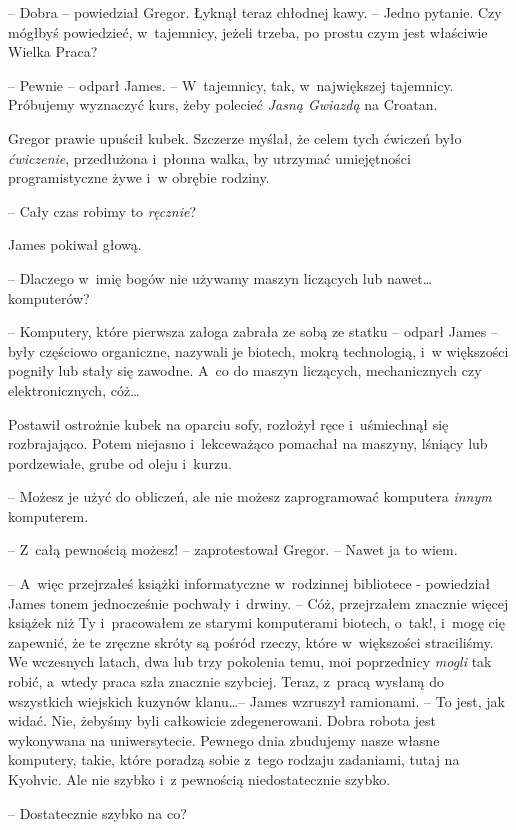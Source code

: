 \documentclass[oneside,polish,12pt,sfheadings]{mwbk}
\begin{document}
-- Dobra -- powiedział Gregor. Łyknął teraz chłodnej kawy. -- Jedno
pytanie. Czy mógłbyś powiedzieć, w~tajemnicy, jeżeli trzeba, po prostu
czym jest właściwie Wielka Praca?

-- Pewnie -- odparł James. -- W~tajemnicy, tak, w~największej tajemnicy.
Próbujemy wyznaczyć kurs, żeby polecieć \emph{Jasną Gwiazdą} na Croatan.

Gregor prawie upuścił kubek. Szczerze myślał, że celem tych ćwiczeń było
\emph{ćwiczenie}, przedłużona i~płonna walka, by utrzymać umiejętności
programistyczne żywe i~w obrębie rodziny.

-- Cały czas robimy to \emph{ręcznie}?

James pokiwał głową.

-- Dlaczego w~imię bogów nie używamy maszyn liczących lub nawet\ldots
komputerów?

-- Komputery, które pierwsza załoga zabrała ze sobą ze statku -- odparł
James -- były częściowo organiczne, nazywali je biotech, mokrą
technologią, i~w większości pogniły lub stały się zawodne. A~co do
maszyn liczących, mechanicznych czy elektronicznych, cóż\ldots

Postawił ostrożnie kubek na oparciu sofy, rozłożył ręce i~uśmiechnął się
rozbrajająco. Potem niejasno i~lekceważąco pomachał na maszyny, lśniący
lub pordzewiałe, grube od oleju i~kurzu. 

-- Możesz je użyć do obliczeń,
ale nie możesz zaprogramować komputera \emph{innym} komputerem.

-- Z~całą pewnością możesz! -- zaprotestował Gregor. -- Nawet ja to wiem.

-- A~więc przejrzałeś książki informatyczne w~rodzinnej bibliotece -
powiedział James tonem jednocześnie pochwały i~drwiny. -- Cóż,
przejrzałem znacznie więcej książek niż Ty i~pracowałem ze starymi
komputerami biotech, o~tak!, i~mogę cię zapewnić, że te zręczne skróty
są pośród rzeczy, które w~większości straciliśmy. We wczesnych latach,
dwa lub trzy pokolenia temu, moi poprzednicy \emph{mogli} tak robić, a~wtedy praca szła znacznie szybciej. Teraz, z~pracą wysłaną do wszystkich
wiejskich kuzynów klanu\ldots -- James wzruszył ramionami. -- To jest, jak
widać. Nie, żebyśmy byli całkowicie zdegenerowani. Dobra robota jest
wykonywana na uniwersytecie. Pewnego dnia zbudujemy nasze własne
komputery, takie, które poradzą sobie z~tego rodzaju zadaniami, tutaj na
Kyohvic. Ale nie szybko i~z pewnością niedostatecznie szybko.

-- Dostatecznie szybko na co?
\end{document}
